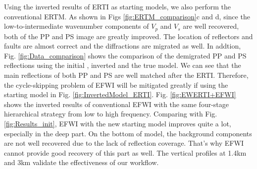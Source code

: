 \documentclass[extra,mreferee]{gji}
\begin{document}
Using the inverted results of ERTI as starting models, we also perform the conventional ERTM. 
As shown in Figs \ref{fig:ERTM_comparison}c and d, 
since the low-to-intermediate wavenumber components of $V_p$ and $V_s$ are well recovered,
both of the PP and PS image are greatly improved. The location of reflectors and faults are almost correct and the
diffractions are migrated as well. 
In addtion, Fig. \ref{fig:Data_comparison} shows the comparison of the demigrated PP and PS
reflections using the initial , inverted and  
the true model. We can see that the main reflections of both PP and PS are well matched after the
ERTI. Therefore, the cycle-skipping problem of EFWI will be mitigated greatly if using the starting model in
Fig. \ref{fig:InvertedModel_ERTI}.
Fig. 
\ref{fig:EWERTI+EFWI} shows the inverted results of conventional EFWI with the same
four-stage hierarchical strategy from low to high frequency. Comparing with 
Fig. \ref{fig:Results_init}, EFWI with the new starting model improves quite a lot,
especially in the deep part. 
On the bottom of model, the background components are not well recovered due to
the lack of reflection coverage.
That's why EFWI cannot provide good recovery of this part as well.
The vertical profiles at 1.4km and 3km validate the effectiveness of
our workflow.
\end{document}
